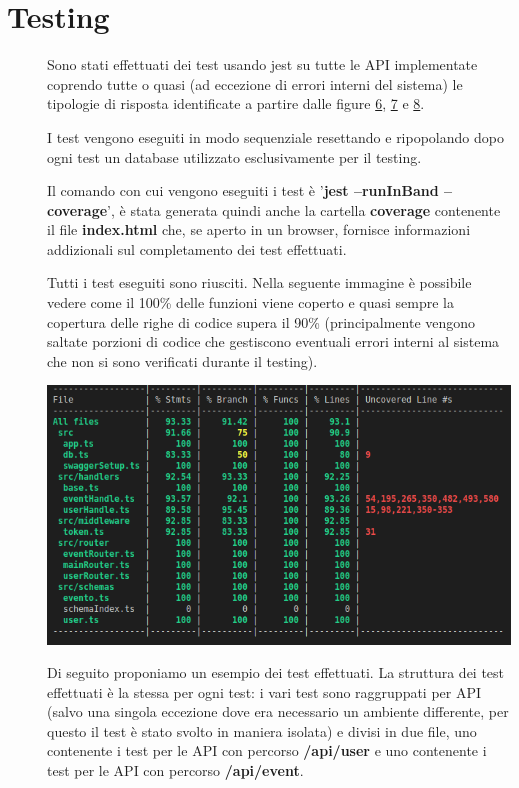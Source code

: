 \documentclass{article}
\begin{document}
\section{Testing}
\begin{description}
    \item[] Sono stati effettuati dei test usando jest su tutte le API implementate coprendo tutte o quasi (ad eccezione di errori interni del sistema) le tipologie di risposta identificate a partire dalle figure \hyperref[img:6]{6}, \hyperref[img:7]{7} e \hyperref[img:8]{8}.
    \item[] I test vengono eseguiti in modo sequenziale resettando e ripopolando dopo ogni test un database utilizzato esclusivamente per il testing.
    \item[] Il comando con cui vengono eseguiti i test è '\textbf{jest --runInBand --coverage}', è stata generata quindi anche la cartella \textbf{coverage} contenente il file \textbf{index.html} che, se aperto in un browser, fornisce informazioni addizionali sul completamento dei test effettuati.
    \item[] Tutti i test eseguiti sono riusciti. Nella seguente immagine è possibile vedere come il 100\% delle funzioni viene coperto e quasi sempre la copertura delle righe di codice supera il 90\% (principalmente vengono saltate porzioni di codice che gestiscono eventuali errori interni al sistema che non si sono verificati durante il testing).
    \item[] \begin{center}
            \includegraphics[scale=0.5]{testOut.png}
        \end{center}
        \clearpage
    \item[] Di seguito proponiamo un esempio dei test effettuati. La struttura dei test effettuati è la stessa per ogni test: i vari test sono raggruppati per API (salvo una singola eccezione dove era necessario un ambiente differente, per questo il test è stato svolto in maniera isolata) e divisi in due file, uno contenente i test per le API con percorso \textbf{/api/user} e uno contenente i test per le API con percorso \textbf{/api/event}.

\end{description}
\end{document}

